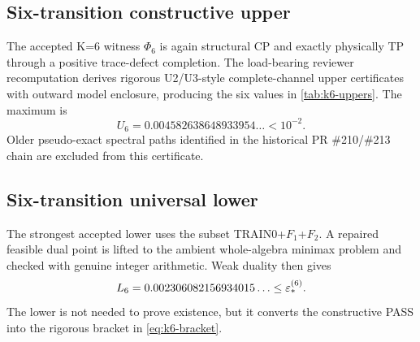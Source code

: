 \subsection{Six-transition constructive upper}

The accepted K=6 witness $\Phi_6$ is again structural CP and exactly physically TP through a positive trace-defect completion.  The load-bearing reviewer recomputation derives rigorous U2/U3-style complete-channel upper certificates with outward model enclosure, producing the six values in \cref{tab:k6-uppers}.  The maximum is
\begin{equation}
U_6=0.004582638648933954\ldots<10^{-2}.
\end{equation}
Older pseudo-exact spectral paths identified in the historical PR \#210/\#213 chain are excluded from this certificate.

\subsection{Six-transition universal lower}

The strongest accepted lower uses the subset TRAIN0+$F_1$+$F_2$.  A repaired feasible dual point is lifted to the ambient whole-algebra minimax problem and checked with genuine integer arithmetic.  Weak duality then gives
\begin{equation}
L_6=0.002306082156934015\ldots\le\varepsilon_*^{(6)}.
\end{equation}
The lower is not needed to prove existence, but it converts the constructive PASS into the rigorous bracket in \cref{eq:k6-bracket}.
